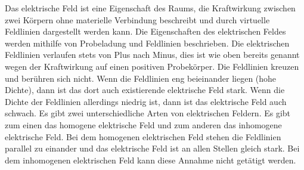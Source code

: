 Das elektrische Feld ist eine Eigenschaft des Raums, die Kraftwirkung zwischen zwei Körpern ohne materielle Verbindung beschreibt und durch virtuelle Feldlinien dargestellt werden kann. 
Die Eigenschaften des elektrischen Feldes werden mithilfe von Probeladung und Feldlinien beschrieben.
Die elektrischen Feldlinien verlaufen stets von Plus nach Minus, dies ist wie oben bereits genannt wegen der Kraftwirkung auf einen positiven Probekörper.
Die Feldlinien kreuzen und berühren sich nicht.
Wenn die Feldlinien eng beieinander liegen (hohe Dichte), dann ist das dort auch existierende elektrische Feld stark.
Wenn die Dichte der Feldlinien allerdings niedrig ist, dann ist das elektrische Feld auch schwach.
Es gibt zwei unterschiedliche Arten von elektrischen Feldern. 
Es gibt zum einen das homogene elektrische Feld und zum anderen das inhomogene elektrische Feld.
Bei dem homogenen elektrischen Feld stehen die Feldlinien parallel zu einander und das elektrische Feld ist an allen Stellen gleich stark.
Bei dem inhomogenen elektrischen Feld kann diese Annahme nicht getätigt werden.
